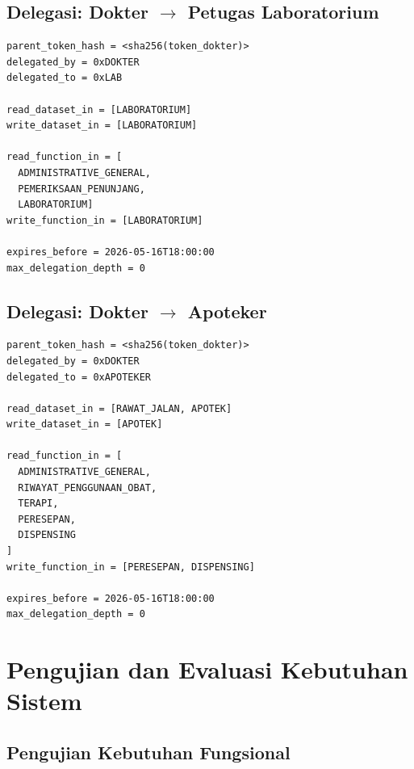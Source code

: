 \documentclass[bahasa, 12pt, a4paper, onecolumn, oneside, final]{report}
\begin{document}
\section*{Delegasi: Dokter $\rightarrow$ Petugas Laboratorium}
\label{subsec:contoh-caveat-token-macaroon-delegasi-lab}

\begin{lstlisting}[caption={Contoh \textit{Caveat} Delegasi Dokter $\rightarrow$ Petugas Laboratorium}, label={lst:contoh-token-delegasi-lab}]
parent_token_hash = <sha256(token_dokter)>
delegated_by = 0xDOKTER
delegated_to = 0xLAB

read_dataset_in = [LABORATORIUM]
write_dataset_in = [LABORATORIUM]

read_function_in = [
  ADMINISTRATIVE_GENERAL, 
  PEMERIKSAAN_PENUNJANG, 
  LABORATORIUM]
write_function_in = [LABORATORIUM]

expires_before = 2026-05-16T18:00:00
max_delegation_depth = 0
\end{lstlisting}

\section*{Delegasi: Dokter $\rightarrow$ Apoteker}
\label{subsec:contoh-caveat-token-macaroon-delegasi-apoteker}

\begin{lstlisting}[caption={Contoh \textit{Caveat} Delegasi Dokter $\rightarrow$ Apoteker}, label={lst:contoh-token-delegasi-apoteker}]
parent_token_hash = <sha256(token_dokter)>
delegated_by = 0xDOKTER
delegated_to = 0xAPOTEKER

read_dataset_in = [RAWAT_JALAN, APOTEK]
write_dataset_in = [APOTEK]

read_function_in = [
  ADMINISTRATIVE_GENERAL,
  RIWAYAT_PENGGUNAAN_OBAT,
  TERAPI,
  PERESEPAN,
  DISPENSING
]
write_function_in = [PERESEPAN, DISPENSING]

expires_before = 2026-05-16T18:00:00
max_delegation_depth = 0
\end{lstlisting}
\chapter{Pengujian dan Evaluasi Kebutuhan Sistem}
\label{lampiran:pengujian-dan-evaluasi-kebutuhan-sistem}

\section{Pengujian Kebutuhan Fungsional}
\end{document}
